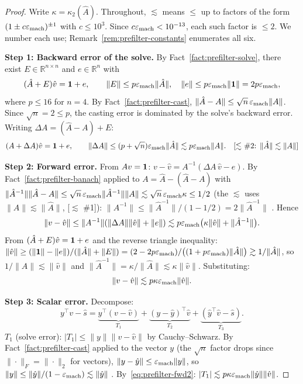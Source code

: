 \begin{proof}
Write $\kappa = \kappa_2(\hat{A})$.
Throughout, $\lesssim$ means $\le$ up to factors of the
form $(1 \pm c\varepsilon_{\mathrm{mach}})^{\pm 1}$ with $c \le 10^3$.
Since $c\varepsilon_{\mathrm{mach}} < 10^{-13}$, each such factor is $\le 2$.
We number each use; Remark~\ref{rem:prefilter-constants}
enumerates all six.

\medskip\noindent\textbf{Step 1: Backward error of the solve.}
By Fact~\ref{fact:prefilter-solve}, there exist
$E \in \mathbb{R}^{n \times n}$ and
$e \in \mathbb{R}^n$ with
\[
  (\hat{A} + E)\hat{v} = \mathbf{1} + e, \qquad
  \|E\| \le p\varepsilon_{\mathrm{mach}}\|\hat{A}\|, \quad
  \|e\| \le p\varepsilon_{\mathrm{mach}}\|\mathbf{1}\| = 2p\varepsilon_{\mathrm{mach}},
\]
where $p \le 16$ for $n = 4$.
By Fact~\ref{fact:prefilter-cast},
$\|\hat{A} - A\| \le \sqrt{n}\,\varepsilon_{\mathrm{mach}}\|A\|$.
Since $\sqrt{n} = 2 \le p$, the casting error
is dominated by the solve's backward error.
Writing $\Delta A = (\hat{A} - A) + E$:
\[
  (A + \Delta A)\hat{v} = \mathbf{1} + e, \qquad
  \|\Delta A\| \le (p + \sqrt{n})\varepsilon_{\mathrm{mach}}\|\hat{A}\|
  \lesssim p\varepsilon_{\mathrm{mach}}\|A\|.
  \quad\text{[$\lesssim$ \#2: $\|\hat{A}\| \lesssim \|A\|$]}
\]

\medskip\noindent\textbf{Step 2: Forward error.}
From $Av = \mathbf{1}$:
$v - \hat{v} = A^{-1}(\Delta A\,\hat{v} - e)$.
By Fact~\ref{fact:prefilter-banach}
applied to $A = \hat{A} - (\hat{A} - A)$
with $\|\hat{A}^{-1}\|\|\hat{A} - A\| \le
\sqrt{n}\,\varepsilon_{\mathrm{mach}}\|\hat{A}^{-1}\|\|A\|
\lesssim \sqrt{n}\,\varepsilon_{\mathrm{mach}}\kappa \le 1/2$
(the $\lesssim$ uses $\|A\| \lesssim \|\hat{A}\|$,
[$\lesssim$ \#1]):
$\|A^{-1}\| \le \|\hat{A}^{-1}\|/(1 - 1/2)
= 2\|\hat{A}^{-1}\|$
\quad[$\lesssim$ \#3].
Hence
\begin{equation}\label{eq:prefilter-fwd}
  \|v - \hat{v}\| \le \|A^{-1}\|(\|\Delta A\|\|\hat{v}\| + \|e\|)
  \lesssim
  p\varepsilon_{\mathrm{mach}}\bigl(\kappa\|\hat{v}\| + \|\hat{A}^{-1}\|\bigr).
\end{equation}
From $(\hat{A} + E)\hat{v} = \mathbf{1} + e$
and the reverse triangle inequality:
$\|\hat{v}\| \ge
(\|\mathbf{1}\| - \|e\|)/(\|\hat{A}\| + \|E\|)
= (2 - 2p\varepsilon_{\mathrm{mach}})/\bigl((1 + p\varepsilon_{\mathrm{mach}})\|\hat{A}\|\bigr)
\gtrsim 1/\|\hat{A}\|$,
so $1/\|\hat{A}\| \lesssim \|\hat{v}\|$
\quad[$\lesssim$ \#4]
and $\|\hat{A}^{-1}\| = \kappa/\|\hat{A}\|
\lesssim \kappa\|\hat{v}\|$.
Substituting:
\begin{equation}\label{eq:prefilter-fwd2}
  \|v - \hat{v}\| \lesssim p\kappa\varepsilon_{\mathrm{mach}}\|\hat{v}\|.
\end{equation}

\medskip\noindent\textbf{Step 3: Scalar error.}
Decompose:
\[
  y^\top v - \hat{s}
  = \underbrace{y^\top(v - \hat{v})}_{T_1}
  + \underbrace{(y - \hat{y})^\top\hat{v}}_{T_2}
  + \underbrace{(\hat{y}^\top\hat{v} - \hat{s})}_{T_3}.
\]
\emph{$T_1$} (solve error):
$|T_1| \le \|y\|\|v - \hat{v}\|$
by Cauchy--Schwarz.
By Fact~\ref{fact:prefilter-cast} applied to the vector $y$
(the $\sqrt{n}$ factor drops since $\|\cdot\|_F = \|\cdot\|_2$
for vectors),
$\|y - \hat{y}\| \le \varepsilon_{\mathrm{mach}}\|y\|$,
so $\|y\| \le \|\hat{y}\|/(1 - \varepsilon_{\mathrm{mach}}) \lesssim \|\hat{y}\|$
\quad[$\lesssim$ \#5].
By~\eqref{eq:prefilter-fwd2}:
$|T_1| \lesssim p\kappa\varepsilon_{\mathrm{mach}}\|\hat{y}\|\|\hat{v}\|$.


\end{proof}
